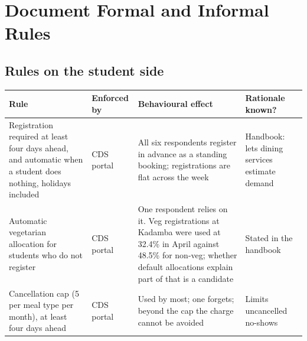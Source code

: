 \documentclass[
  10pt,
  table]{article}
\newcounter{none} %
\begin{document}
\section{Document Formal and Informal Rules}\label{document-formal-and-informal-rules}

\subsection{Rules on the student side}\label{rules-on-the-student-side}

{\def\LTcaptype{none} %
\begin{longtable}[]{@{}
  >{\raggedright\arraybackslash}p{}
  >{\raggedright\arraybackslash}p{}
  >{\raggedright\arraybackslash}p{}
  >{\raggedright\arraybackslash}p{}@{}}
\toprule\noalign{}
\begin{minipage}[b]{\linewidth}\raggedright
\cellcolor{pblue}\color{white}\bfseries Rule
\end{minipage} & \begin{minipage}[b]{\linewidth}\raggedright
\cellcolor{pblue}\color{white}\bfseries Enforced by
\end{minipage} & \begin{minipage}[b]{\linewidth}\raggedright
\cellcolor{pblue}\color{white}\bfseries Behavioural effect
\end{minipage} & \begin{minipage}[b]{\linewidth}\raggedright
\cellcolor{pblue}\color{white}\bfseries Rationale known?
\end{minipage} \\
\midrule\noalign{}
\endhead
\bottomrule\noalign{}
\endlastfoot
Registration required at least four days ahead, and automatic when a student does nothing, holidays included & CDS portal & All six respondents register in advance as a standing booking; registrations are flat across the week & Handbook: lets dining services estimate demand \\
Automatic vegetarian allocation for students who do not register & CDS portal & One respondent relies on it. Veg registrations at Kadamba were used at 32.4\% in April against 48.5\% for non-veg; whether default allocations explain part of that is a candidate & Stated in the handbook \\
Cancellation cap (5 per meal type per month), at least four days ahead & CDS portal & Used by most; one forgets; beyond the cap the charge cannot be avoided & Limits uncancelled no-shows \\

\end{longtable}}
\end{document}
